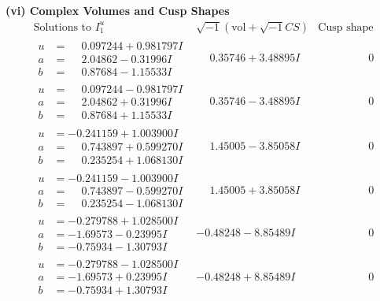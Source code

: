 \documentclass[1p]{elsarticle_modified}
\theoremstyle{definition}
\newcommand{\I}{\sqrt{-1}}
\begin{document}
\newpage\flushleft \textbf{(vi) Complex Volumes and Cusp Shapes}
$$\begin{array}{c|c|c}  
\text{Solutions to }I^u_{1}& \I (\text{vol} + \sqrt{-1}CS) & \text{Cusp shape}\\
 \hline 
\begin{aligned}
u &= \phantom{-}0.097244 + 0.981797 I \\
a &= \phantom{-}2.04862 - 0.31996 I \\
b &= \phantom{-}0.87684 - 1.15533 I\end{aligned}
 & \phantom{-}0.35746 + 3.48895 I & \phantom{-0.000000 } 0 \\ \hline\begin{aligned}
u &= \phantom{-}0.097244 - 0.981797 I \\
a &= \phantom{-}2.04862 + 0.31996 I \\
b &= \phantom{-}0.87684 + 1.15533 I\end{aligned}
 & \phantom{-}0.35746 - 3.48895 I & \phantom{-0.000000 } 0 \\ \hline\begin{aligned}
u &= -0.241159 + 1.003900 I \\
a &= \phantom{-}0.743897 + 0.599270 I \\
b &= \phantom{-}0.235254 + 1.068130 I\end{aligned}
 & \phantom{-}1.45005 - 3.85058 I & \phantom{-0.000000 } 0 \\ \hline\begin{aligned}
u &= -0.241159 - 1.003900 I \\
a &= \phantom{-}0.743897 - 0.599270 I \\
b &= \phantom{-}0.235254 - 1.068130 I\end{aligned}
 & \phantom{-}1.45005 + 3.85058 I & \phantom{-0.000000 } 0 \\ \hline\begin{aligned}
u &= -0.279788 + 1.028500 I \\
a &= -1.69573 - 0.23995 I \\
b &= -0.75934 - 1.30793 I\end{aligned}
 & -0.48248 - 8.85489 I & \phantom{-0.000000 } 0 \\ \hline\begin{aligned}
u &= -0.279788 - 1.028500 I \\
a &= -1.69573 + 0.23995 I \\
b &= -0.75934 + 1.30793 I\end{aligned}
 & -0.48248 + 8.85489 I & \phantom{-0.000000 } 0 \\ \hline\begin{aligned}

\end{aligned}
\end{array}$$
\end{document}

